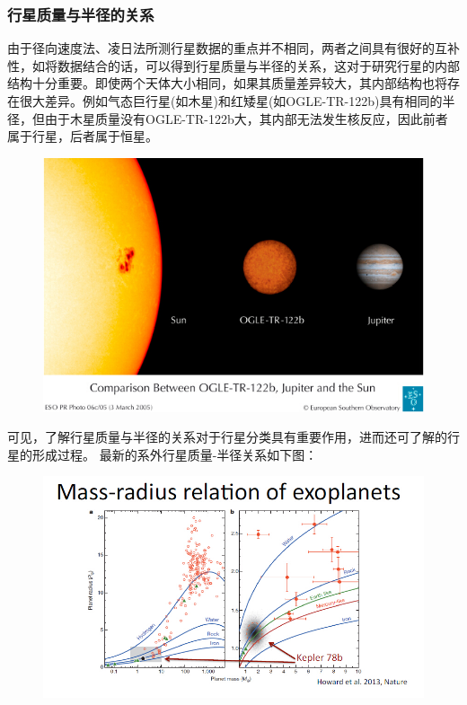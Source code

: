\documentclass[letterpaper,10pt,english]{sphinxmanual}
\begin{document}
\subsubsection{行星质量与半径的关系}
\label{statistics:id10}
由于径向速度法、凌日法所测行星数据的重点并不相同，两者之间具有很好的互补性，如将数据结合的话，可以得到行星质量与半径的关系，这对于研究行星的内部结构十分重要。即使两个天体大小相同，如果其质量差异较大，其内部结构也将存在很大差异。例如气态巨行星(如木星)和红矮星(如OGLE-TR-122b)具有相同的半径，但由于木星质量没有OGLE-TR-122b大，其内部无法发生核反应，因此前者属于行星，后者属于恒星。
\begin{figure}[htbp]
\centering

\includegraphics{Mass_and_radius.jpg}
\end{figure}

可见，了解行星质量与半径的关系对于行星分类具有重要作用，进而还可了解的行星的形成过程。
最新的系外行星质量-半径关系如下图：
\begin{figure}[htbp]
\centering

\includegraphics{Mass-radius.jpg}
\end{figure}
\end{document}
